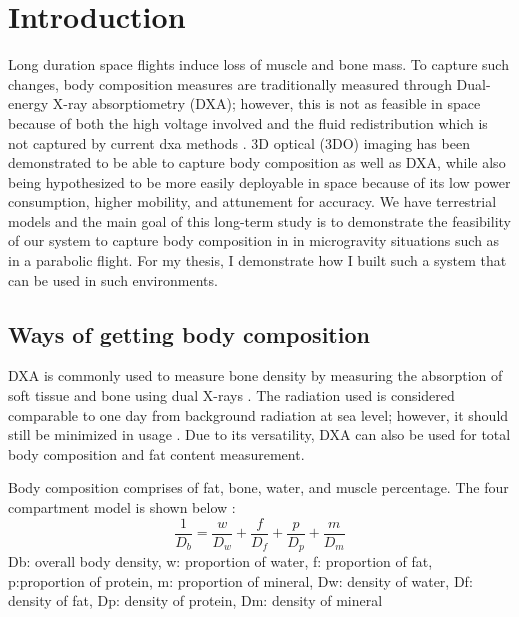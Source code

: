 

\chapter{Introduction}

Long duration space flights induce loss of muscle and bone mass. To capture such changes, body composition measures are traditionally measured through Dual-energy X-ray absorptiometry (DXA); however, this is not as feasible in space because of both the high voltage involved and the fluid redistribution which is not captured by current dxa methods \cite{sibonga2015evaluating}. 3D optical (3DO) imaging has been demonstrated to be able to capture body composition as well as DXA, while also being hypothesized to be more easily deployable in space because of its low power consumption, higher mobility, and attunement for accuracy. We have terrestrial models and the main goal of this long-term study is to demonstrate the feasibility of our system to capture body composition in in microgravity situations such as in a parabolic flight. For my thesis, I demonstrate how I built such a system that can be used in such environments. 
\section{Ways of getting body composition}
DXA is commonly used to measure bone density by measuring the absorption of soft tissue and bone using dual X-rays \cite{albanese2003clinical}. The radiation used is considered comparable to one day from background radiation at sea level; however, it should still be minimized in usage \cite{damilakis2010radiation}. Due to its versatility, DXA can also be used for total body composition and fat content measurement.

Body composition comprises of fat, bone, water, and muscle percentage. The four compartment model is shown below \cite{fuller1992four}:
\begin{equation}
	\frac{1}{D_b} = \frac{w}{D_w} + \frac{f}{D_f} + \frac{p}{D_p} + \frac{m}{D_m}
\end{equation}
Db: overall body density, w: proportion of water, f: proportion of fat, p:proportion of protein, m: proportion of mineral, Dw: density of water, Df: density of fat, Dp: density of protein, Dm: density of mineral

